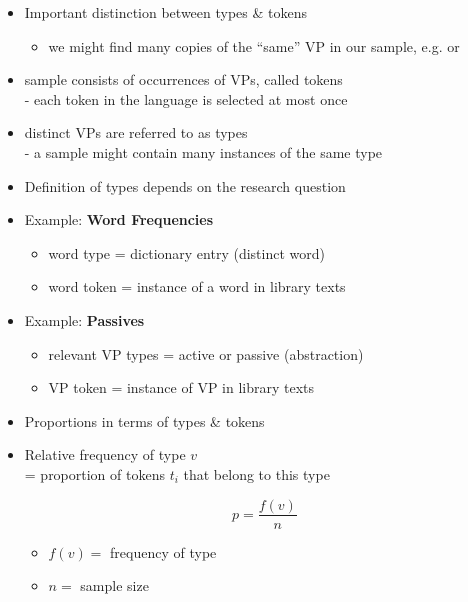 \documentclass[a4paper,landscape,headrule,footrule,xetex]{foils}
\begin{document}
\begin{itemize}
\item Important distinction between types \& tokens
\begin{itemize}
\item we might find many copies of the “same” VP in our
sample, e.g.  or
\end{itemize}
\item sample consists of occurrences of VPs, called tokens
\\ - each token in the language is selected at most once
\item distinct VPs are referred to as types
\\ - a sample might contain many instances of the same type
\item Definition of types depends  on the research question
\end{itemize}

\begin{itemize}
\item Example: \textbf{Word Frequencies}
\begin{itemize}
\item word type = dictionary entry (distinct word)
\item word token = instance of a word in library texts
\end{itemize}
\item Example: \textbf{Passives}
\begin{itemize}
\item relevant VP types = active or passive (\into abstraction)
\item VP token = instance of VP in library texts
\end{itemize}
\end{itemize}

\begin{itemize}
\item Proportions in terms of types \& tokens
\item Relative frequency of type $v$
\\ = proportion of tokens $t_i$ that belong to this type

\begin{equation}
  \label{eq:2}
   p = \frac{f(v)}{n}
\end{equation}
\begin{itemize}
\item $f(v) = $ frequency of type
\item $n = $ sample size
\end{itemize}
\end{itemize}
\end{document}
